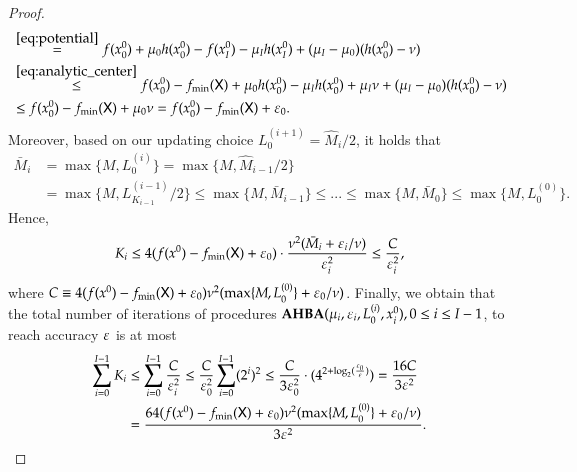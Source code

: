 \begin{proof}
\begin{align}
& \stackrel{\eqref{eq:potential}}{=} f(x^{0}_0) + \mu_0 h(x^{0}_0)- f(x^{0}_{I}) - \mu_{I}h(x^{0}_{I}) + (\mu_{I} - \mu_{0}) (h(x_0^0)-\nu) \notag \\
& \stackrel{\eqref{eq:analytic_center}}{\leq} f(x^{0}_0) - f_{\min}(\mathsf{X}) + \mu_0 h(x^{0}_0) - \mu_{I}h(x^{0}_{0}) + \mu_{I} \nu + (\mu_{I} - \mu_{0}) (h(x_0^0)-\nu) \notag \\ 
& \leq f(x^{0}_0) - f_{\min}(\mathsf{X}) + \mu_0 \nu = f(x^{0}_0) - f_{\min}(\mathsf{X}) + \varepsilon_0.
\label{eq:PF_proof_3} 
\end{align}
Moreover, based on our updating choice $L_0^{(i+1)}=\hat{M}_{i}/2$, it holds that 
\begin{align*}
\bar{M}_i &= \max\{M,L_0^{(i)}\} = \max\{M,\hat{M}_{i-1}/2\}\\
& = \max\{M,L_{K_{i-1}}^{(i-1)}/2\} \leq \max\{M,\bar{M}_{i-1}\} \leq ... \leq \max\{M, \bar{M}_{0}\} \leq  \max\{M,L_0^{(0)}\}.
\end{align*}
Hence, 
\begin{align}
K_i \leq  4(f(x^{0}) - f_{\min}(\mathsf{X})+  \varepsilon_0) \cdot \frac{\nu^{2}(\bar{M}_i+\varepsilon_i/\nu)}{\varepsilon_i^{2}} \leq \frac{C}{\varepsilon_i^2},
\label{eq:PF_proof_4} 
\end{align}
where $C\equiv 4(f(x^{0})-f_{\min}(\mathsf{X})+\varepsilon_0)\nu^2(\max\{M,L_0^{(0)}\}+\varepsilon_0/\nu)$. Finally, we obtain that the total number of iterations of procedures $\operatorname{\mathbf{AHBA}}(\mu_{i},\varepsilon_{i},L_0^{(i)},x_{i}^{0}),0\leq i \leq I-1$, to reach accuracy $\varepsilon$ is at most
\begin{align*}
\sum_{i=0}^{I-1}K_{i}&\leq \sum_{i=0}^{I-1} \frac{C}{\varepsilon_i^2} \leq \frac{C}{\varepsilon_0^2} \sum_{i=0}^{I-1} (2^i)^2 
\leq \frac{C}{3\varepsilon_0^2} \cdot (4^{2+\log_2(\frac{\varepsilon_0}{\varepsilon})}) = \frac{16C}{3\varepsilon^2}\\
&=\frac{64(f(x^{0})-f_{\min}(\mathsf{X})+\varepsilon_0)\nu^2(\max\{M,L_0^{(0)}\}+\varepsilon_0/\nu)}{3\varepsilon^{2}}.
\end{align*}
\end{proof}